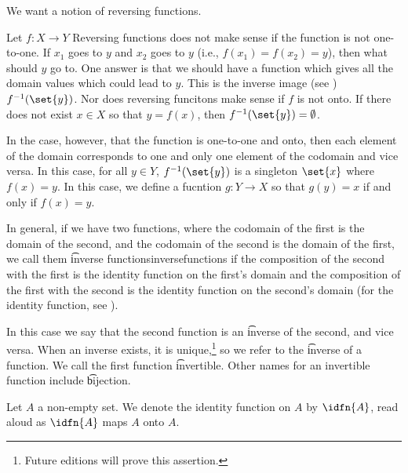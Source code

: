 

We want a notion of reversing functions.


Let $f: X \to Y$
Reversing functions does not make sense if the function is not one-to-one.
If $x_1$ goes to $y$ and $x_2$ goes to $y$ (i.e., $f(x_1) = f(x_2) = y$), then what should $y$ go to.
One answer is that we should have a function which gives all the domain values which could lead to $y$.
This is the inverse image (see ) $f^{-1}(\set{y})$.
Nor does reversing funcitons make sense if $f$ is not onto.
If there does not exist $x \in X$ so that $y = f(x)$, then $f^{-1}(\set{y}) = \emptyset$.

In the case, however, that the function is one-to-one and onto, then each element of the domain corresponds to one and only one element of the codomain and vice versa.
In this case, for all $y \in Y$, $f^{-1}(\set{y})$ is a singleton $\set{x}$ where $f(x) = y$.
In this case, we define a fucntion $g: Y \to X$ so that $g(y) = x$ if and only if $f(x) = y$.


In general, if we have two functions, where the codomain of the first is the domain of the second, and the codomain of the second is the domain of the first, we call them \t{inverse functions}{inversefunctions} if the composition of the second with the first is the identity function on the first's domain and the composition of the first with the second is the identity function on the second's domain (for the identity function, see ).

In this case we say that the second function is an \t{inverse} of the second, and vice versa.
When an inverse exists, it is unique,\footnote{Future editions will prove this assertion.} so we refer to the \t{inverse}
of a function.
We call the first function \t{invertible}.
Other names for an invertible function include \t{bijection}.


Let $A$ a non-empty set.
We denote the identity
function on $A$ by $\idfn{A}$,
read aloud as
$\idfn{A}$ maps $A$ onto $A$.

